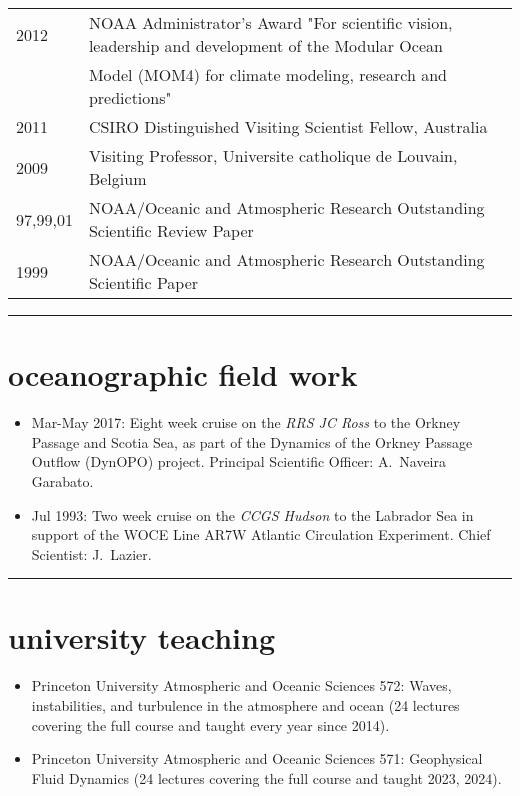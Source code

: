 \documentclass{article}
\begin{document}
\begin{tabular}{ll}
  2012 & NOAA Administrator's Award "For scientific vision, leadership
  and development of 
  the Modular Ocean \\ & Model (MOM4) for climate modeling, research and
  predictions" \\
  2011 & CSIRO Distinguished Visiting Scientist Fellow, Australia \\
  2009 & Visiting Professor, Universite catholique de Louvain, Belgium\\
  97,99,01 & NOAA/Oceanic and Atmospheric Research Outstanding Scientific
  Review Paper\\
  1999 & NOAA/Oceanic and Atmospheric Research Outstanding Scientific Paper
\end{tabular}

\noindent\rule{\textwidth}{1pt}
\vspace{-1cm}
\section*{\sc \color{Maroon}  oceanographic field work}
\vspace{-.25cm}

\begin{itemize}[leftmargin=*]
 \item 
 Mar-May 2017: Eight week cruise on the {\it RRS JC Ross}  to the Orkney Passage and Scotia Sea,
  as part of the
  Dynamics of the Orkney Passage Outflow (DynOPO) project. Principal Scientific Officer: A.\ Naveira Garabato. 
 \item 
  Jul 1993: Two week cruise on the {\it CCGS Hudson} to the Labrador Sea in support of  the WOCE Line AR7W Atlantic Circulation Experiment. Chief Scientist: J.\ Lazier.
\end{itemize}

\vspace{-.4cm}
\noindent\rule{\textwidth}{1pt}
\vspace{-1cm}
\section*{\sc  \color{Maroon}  university teaching}
\vspace{-.3cm}

\begin{itemize}[leftmargin=*]

\item Princeton University Atmospheric and Oceanic Sciences 572: Waves, instabilities, and turbulence in the atmosphere and ocean (24 lectures covering the full course and taught every year since 2014). 

\item Princeton University Atmospheric and Oceanic Sciences 571: Geophysical Fluid Dynamics (24 lectures covering the full course and taught 2023, 2024).

\end{itemize}
\end{document}
